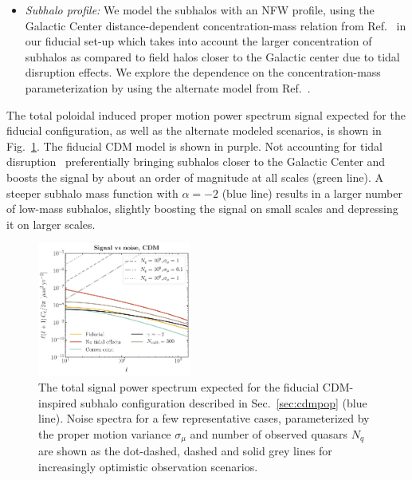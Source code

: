 \documentclass[prd,aps,10pt,nofootinbib,twocolumn,superscriptaddress,preprintnumbers,balancelastpage,longbibliography]{revtex4-1}
\begin{document}
\begin{itemize}
\item \emph{Subhalo profile:} We model the subhalos with an NFW profile, using the Galactic Center distance-dependent concentration-mass relation from Ref.~\cite{Moline:2016pbm} in our fiducial set-up which takes into account the larger concentration of subhalos as compared to field halos closer to the Galactic center due to tidal disruption effects. We explore the dependence on the concentration-mass parameterization by using the alternate model from Ref.~\cite{Correa:2015dva}.

\end{itemize}

The total poloidal induced proper motion power spectrum signal expected for the fiducial configuration, as well as the alternate modeled scenarios, is shown in Fig.~\ref{fig:lcdm_theory}. The fiducial CDM model is shown in purple. Not accounting for tidal disruption~\cite{vandenBosch:2017ynq,vandenBosch:2018tyt} preferentially bringing subhalos closer to the Galactic Center and boosts the signal by about an order of magnitude at all scales (green line). A steeper subhalo mass function with $\alpha=-2$ (blue line) results in a larger number of low-mass subhalos, slightly boosting the signal on small scales and depressing it on larger scales. 

\begin{figure}[htbp]
  \centering
  \includegraphics[width=0.45\textwidth]{plots/LCDMTheoryNoise}
  \caption{The total signal power spectrum expected for the fiducial CDM-inspired subhalo configuration described in Sec.~\ref{sec:cdmpop} (blue line). Noise spectra for a few representative cases, parameterized by the proper motion variance $\sigma_\mu$ and number of observed quasars $N_q$ are shown as the dot-dashed, dashed and solid grey lines for increasingly optimistic observation scenarios.} 
  \label{fig:lcdm_theory}
\end{figure}
\end{document}
